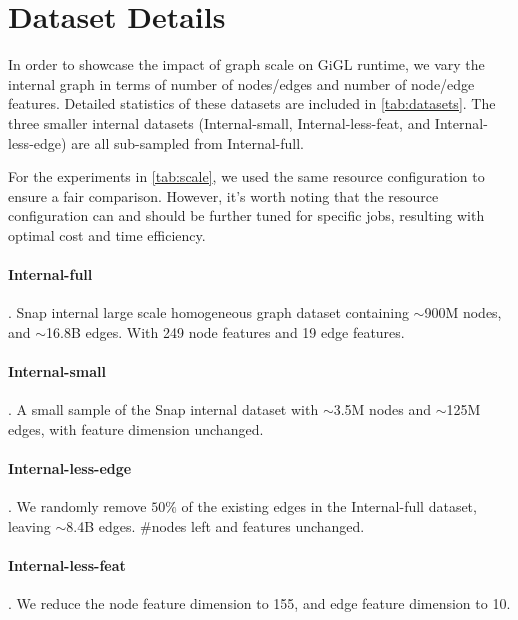 






\section{Dataset Details}
\label{appx:dataset}

In order to showcase the impact of graph scale on GiGL runtime, we vary the internal graph in terms of number of nodes/edges and number of node/edge features. Detailed statistics of these datasets are included in \cref{tab:datasets}. The three smaller internal datasets (Internal-small, Internal-less-feat, and Internal-less-edge) are all sub-sampled from Internal-full.

For the experiments in \cref{tab:scale}, we used the same resource configuration to ensure a fair comparison. However, it's worth noting that the resource configuration can and should be further tuned for specific jobs, resulting with optimal cost and time efficiency.

\paragraph{Internal-full}. Snap internal large scale homogeneous graph dataset containing $\sim${900M} nodes, and $\sim${16.8B} edges. With 249 node features and 19 edge features.

\paragraph{Internal-small}. A small sample of the Snap internal dataset with $\sim${3.5M} nodes and $\sim$125M edges, with feature dimension unchanged.

\paragraph{Internal-less-edge}. We randomly remove $50\%$ of the existing edges in the Internal-full dataset, leaving $\sim$8.4B edges. \#nodes left and features unchanged.

\paragraph{Internal-less-feat}. We reduce the node feature dimension to 155, and edge feature dimension to 10. 

